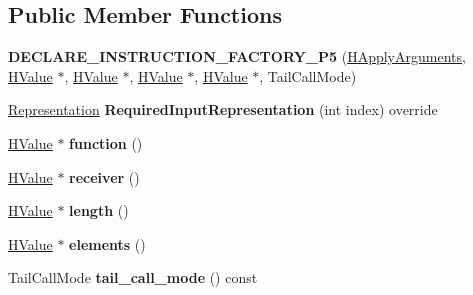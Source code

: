 \subsection*{Public Member Functions}
\begin{DoxyCompactItemize}
\item 
{\bfseries D\+E\+C\+L\+A\+R\+E\+\_\+\+I\+N\+S\+T\+R\+U\+C\+T\+I\+O\+N\+\_\+\+F\+A\+C\+T\+O\+R\+Y\+\_\+\+P5} (\hyperlink{classv8_1_1internal_1_1_h_apply_arguments}{H\+Apply\+Arguments}, \hyperlink{classv8_1_1internal_1_1_h_value}{H\+Value} $\ast$, \hyperlink{classv8_1_1internal_1_1_h_value}{H\+Value} $\ast$, \hyperlink{classv8_1_1internal_1_1_h_value}{H\+Value} $\ast$, \hyperlink{classv8_1_1internal_1_1_h_value}{H\+Value} $\ast$, Tail\+Call\+Mode)\hypertarget{classv8_1_1internal_1_1_h_apply_arguments_ac6bb4a44ecd7b22865dd42263b41acb4}{}\label{classv8_1_1internal_1_1_h_apply_arguments_ac6bb4a44ecd7b22865dd42263b41acb4}

\item 
\hyperlink{classv8_1_1internal_1_1_representation}{Representation} {\bfseries Required\+Input\+Representation} (int index) override\hypertarget{classv8_1_1internal_1_1_h_apply_arguments_a45b4413f988b0db5ae7055a683d118bb}{}\label{classv8_1_1internal_1_1_h_apply_arguments_a45b4413f988b0db5ae7055a683d118bb}

\item 
\hyperlink{classv8_1_1internal_1_1_h_value}{H\+Value} $\ast$ {\bfseries function} ()\hypertarget{classv8_1_1internal_1_1_h_apply_arguments_ab4c7a85d315347ab2c820dc0f6280aae}{}\label{classv8_1_1internal_1_1_h_apply_arguments_ab4c7a85d315347ab2c820dc0f6280aae}

\item 
\hyperlink{classv8_1_1internal_1_1_h_value}{H\+Value} $\ast$ {\bfseries receiver} ()\hypertarget{classv8_1_1internal_1_1_h_apply_arguments_a73f57cb574307892789783780e847993}{}\label{classv8_1_1internal_1_1_h_apply_arguments_a73f57cb574307892789783780e847993}

\item 
\hyperlink{classv8_1_1internal_1_1_h_value}{H\+Value} $\ast$ {\bfseries length} ()\hypertarget{classv8_1_1internal_1_1_h_apply_arguments_acdbdff1a6ec245f4fc837efe91fe31cd}{}\label{classv8_1_1internal_1_1_h_apply_arguments_acdbdff1a6ec245f4fc837efe91fe31cd}

\item 
\hyperlink{classv8_1_1internal_1_1_h_value}{H\+Value} $\ast$ {\bfseries elements} ()\hypertarget{classv8_1_1internal_1_1_h_apply_arguments_a032ba2007169f4f309dc171b4f020206}{}\label{classv8_1_1internal_1_1_h_apply_arguments_a032ba2007169f4f309dc171b4f020206}

\item 
Tail\+Call\+Mode {\bfseries tail\+\_\+call\+\_\+mode} () const \hypertarget{classv8_1_1internal_1_1_h_apply_arguments_a1d32fea6f82460abd0e51e3a4bbc8ee7}{}\label{classv8_1_1internal_1_1_h_apply_arguments_a1d32fea6f82460abd0e51e3a4bbc8ee7}

\end{DoxyCompactItemize}

